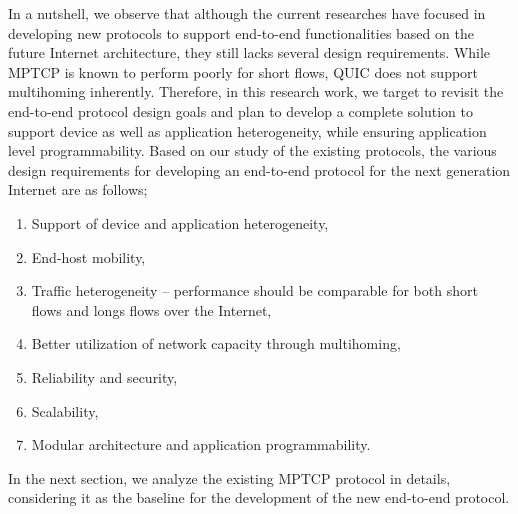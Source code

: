 In a nutshell, we observe that although the current researches have focused in developing new protocols to support end-to-end functionalities based on the future Internet architecture, they still lacks several design requirements. While MPTCP is known to perform poorly for short flows, QUIC does not support multihoming inherently. Therefore, in this research work, we target to revisit the end-to-end protocol design goals and plan to develop a complete solution to support device as well as application heterogeneity, while ensuring application level programmability. Based on our study of the existing protocols, the various design requirements for developing an end-to-end protocol for the next generation Internet are as follows;
\begin{enumerate}
	\item Support of device and application heterogeneity,
	\item End-host mobility, 
	\item Traffic heterogeneity -- performance should be comparable for both short flows and longs flows over the Internet,
	\item Better utilization of network capacity through multihoming,
	\item Reliability and security,
	\item Scalability,  
	\item Modular architecture and application programmability.
\end{enumerate}  
In the next section, we analyze the existing MPTCP protocol in details, considering it as the baseline for the development of the new end-to-end protocol. 